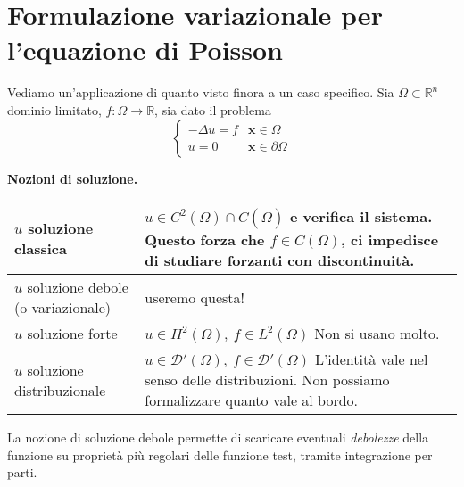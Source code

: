 \documentclass[10pt,a4paper,twoside,openright]{book}
\newcommand{\x}{\mathbf{x}}
\begin{document}
\chapter{Formulazione variazionale per l'equazione di Poisson}

Vediamo un'applicazione di quanto visto finora a un caso specifico. Sia $\displaystyle \Omega \subset \mathbb{R}^{n}$ dominio limitato, $\displaystyle f:\Omega \rightarrow \mathbb{R}$, sia dato il problema
\begin{equation}
	\begin{cases}
		-\Delta u=f & \x \in \Omega          \\
		u=0         & \x \in \partial \Omega 
	\end{cases}
	\label{eq:af-problema-poisson}
\end{equation}
\vspace*{0.5cm}
\begin{center}
	\textbf{Nozioni di soluzione.}
\end{center}
\begin{center}
	{\renewcommand{\arraystretch}{2.8}%
	\begin{tabular}{|l|l|}
		\hline 
		$u$ soluzione classica                               & \makecell[l]{$\displaystyle u\in C^{2}(\Omega) \cap C(\overline{\Omega })$ e verifica il sistema. \\Questo forza che $\displaystyle f\in C(\Omega)$, ci impedisce di studiare\\forzanti con discontinuità.} \\
		\hline 
		\makecell[l]{$u$ soluzione debole\\(o variazionale)} & useremo questa! \\
		\hline 
		$u$ soluzione forte                                  & \makecell[l]{$\displaystyle u\in H^{2}(\Omega) ,\ f\in L^{2}(\Omega)$                           \\Non si usano molto.} \\
		\hline 
		$u$ soluzione distribuzionale                        & \makecell[l]{$\displaystyle u\in \mathcal{D} '(\Omega) ,\ f\in \mathcal{D} '(\Omega)$           \\L'identità vale nel senso delle distribuzioni.\\Non possiamo formalizzare quanto vale al bordo.} \\
		\hline
	\end{tabular}
	}
\end{center}
\vspace*{0.5cm}
La nozione di soluzione debole permette di scaricare eventuali \textit{debolezze} della funzione su proprietà più regolari delle funzione test, tramite integrazione per parti. 
\end{document}
